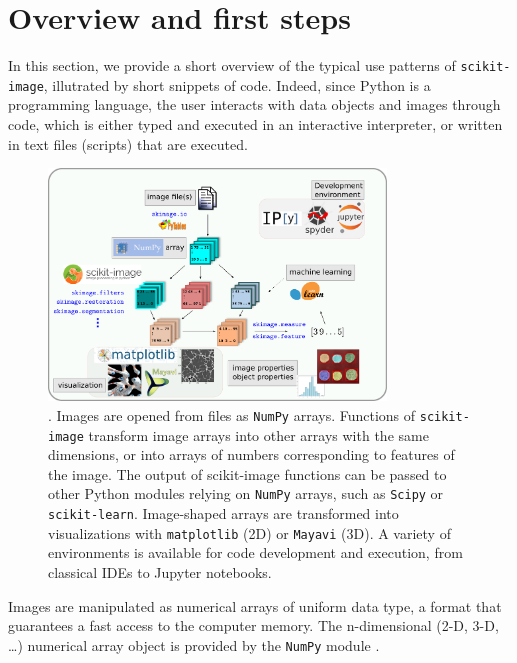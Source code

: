 \documentclass[twocolumn]{bmcart}%
\begin{document}
\section*{Overview and first steps}

In this section, we provide a short overview of the typical use patterns of
\texttt{scikit-image}, illutrated by short snippets of code. Indeed, since
Python is a programming language, the user interacts with data objects and
images through code, which is either typed and executed in an interactive
interpreter, or written in text files (scripts) that are executed. 

\begin{figure}
    \centerline{\includegraphics[width=0.8\textwidth]{ecosystem_landscape}}
    \caption{. Images are opened from files as \texttt{NumPy}
	arrays. Functions of \texttt{scikit-image} transform image arrays
	into other arrays with the same dimensions, or into arrays of
	numbers corresponding to features of the image. The output of
	scikit-image functions can be passed to other Python modules
	relying on \texttt{NumPy} arrays, such as \texttt{Scipy} or
	\texttt{scikit-learn}. Image-shaped arrays are transformed into
	visualizations with \texttt{matplotlib} (2D) or \texttt{Mayavi}
	(3D). A variety of environments is available for code development
	and execution, from classical IDEs to Jupyter notebooks.
    \label{fig:ecosystem}}
\end{figure}


Images are manipulated as numerical arrays of uniform
data type, a format that guarantees a fast access to the computer memory. The
n-dimensional (2-D, 3-D, \dots) numerical array object is provided by the
\texttt{NumPy} module \citep{Vanderwalt2011}.
\end{document}
